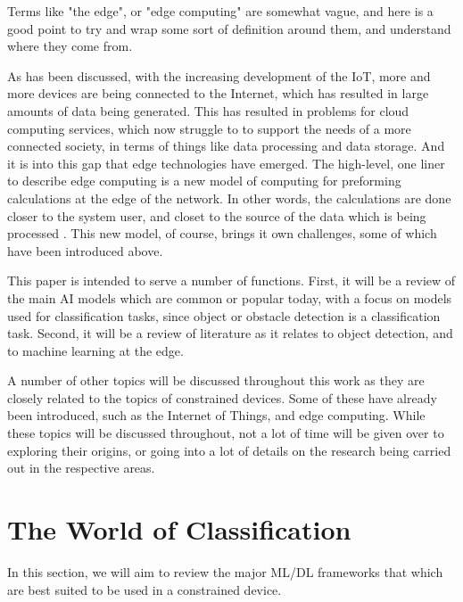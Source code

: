 \documentclass[conference]{IEEEtran}
\begin{document}
Terms like "the edge", or "edge computing" are somewhat vague, and here is a good point to try and wrap some sort of definition around them, and understand where they come from. 

As has been discussed, with the increasing development of the IoT, more and more devices are being connected to the Internet, which has resulted in large amounts of data being generated. This has resulted in problems for cloud computing services, which now struggle to to support the needs of a more connected society, in terms of things like data processing and data storage. And it is into this gap that edge technologies have emerged. The high-level, one liner to describe edge computing is a new model of computing for preforming calculations at the edge of the network. In other words, the calculations are done closer to the system user, and closet to the source of the data which is being processed \cite{Cao2020}. This new model, of course, brings it own challenges, some of which have been introduced above. 

This paper is intended to serve a number of functions. First, it will be a review of the main AI models which are common or popular today, with a focus on models used for classification tasks, since object or obstacle detection is a classification task. Second, it will be a review of literature as it relates to object detection, and to machine learning at the edge.

A number of other topics will be discussed throughout this work as they are closely related to the topics of constrained devices. Some of these have already been introduced, such as the Internet of Things, and edge computing. While these topics will be discussed throughout, not a lot of time will be given over to exploring their origins, or going into a lot of details on the research being carried out in the respective areas. 

\section{The World of Classification}
In this section, we will aim to review the major ML/DL frameworks that which are best suited to be used in a constrained device.
\end{document}

